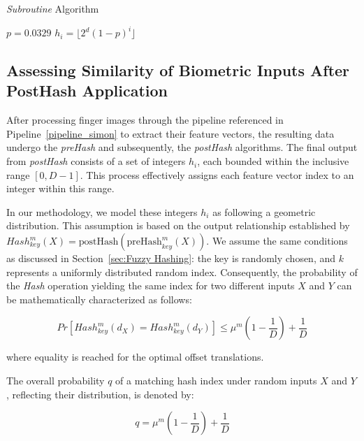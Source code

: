     \begin{algorithm}
    \begin{algorithmic}[1]
    \caption{\textit{Subroutine} Algorithm}
    \label{Subroutine Algorithm}
    \State $p = 0.0329$
    \State $h_i = \lfloor 2^d (1-p)^{i} \rfloor$
    \State {}
    \EndFunction
    \end{algorithmic}
    \end{algorithm}

\subsection{Assessing Similarity of Biometric Inputs After PostHash Application}
\label{sec:q}

After processing finger images through the pipeline referenced in Pipeline~\ref{pipeline_simon} to extract their feature vectors, the resulting data undergo the \textit{preHash} and subsequently, the \textit{postHash} algorithms. The final output from \textit{postHash} consists of a set of integers \( h_i \), each bounded within the inclusive range \([0, D-1]\). This process effectively assigns each feature vector index to an integer within this range.

In our methodology, we model these integers \( h_i \) as following a geometric distribution. This assumption is based on the output relationship established by \( Hash_{key}^m(X) = \text{postHash}(\text{preHash}_{key}^m(X)) \). We assume the same conditions as discussed in Section~\ref{sec:Fuzzy Hashing}: the key is randomly chosen, and \(k\) represents a uniformly distributed random index. Consequently, the probability of the \textit{Hash} operation yielding the same index for two different inputs \(X\) and \(Y\) can be mathematically characterized as follows:

\[Pr[Hash_{key}^m(d_X) = Hash_{key}^m(d_Y)] \leq \mu^m(1 - \frac{1}{D}) + \frac{1}{D}\]

where equality is reached for the optimal offset translations.

The overall probability \( q \) of a matching hash index under random inputs \( X \) and \( Y \), reflecting their distribution, is denoted by:

\begin{equation}
    q = \mu^m\left(1 - \frac{1}{D}\right) + \frac{1}{D}
    \label{eq:q_formula}
\end{equation}
    

